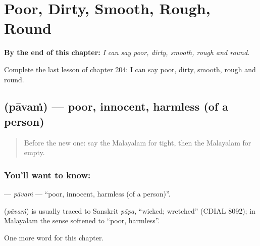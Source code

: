
\chapter{Poor, Dirty, Smooth, Rough, Round}
\label{ch:ml-poor-dirty-smooth-rough-round}

\begin{chapteropening}
\textbf{By the end of this chapter:} \emph{I can say poor, dirty, smooth, rough and round.}

Complete the last lesson of chapter 204: I can say poor, dirty, smooth, rough and round.
\end{chapteropening}

\section[\texorpdfstring{\ml{പാവം} (pāvaṁ)}{പാവം (pāvaṁ)}]{ (pāvaṁ) — poor, innocent, harmless (of a person)}

\label{lesson:ML-C204-pavam}



\begin{quote}
Before the new one: say the Malayalam for tight, then the Malayalam for empty.
\end{quote}

\subsection*{You'll want to know: }
\textbf{} — \emph{pāvaṁ} — \textquotedblleft{}poor, innocent, harmless (of a person)\textquotedblright{}.

\begin{cousinweb}
\textbf{} (\emph{pāvaṁ}) is usually traced to Sanskrit \emph{pāpa}, \textquotedblleft{}wicked; wretched\textquotedblright{} (CDIAL 8092); in Malayalam the sense softened to \textquotedblleft{}poor, harmless\textquotedblright{}.
\end{cousinweb}

\begin{grammarlens}[title={What you've built}]
One more word for this chapter.
\end{grammarlens}

